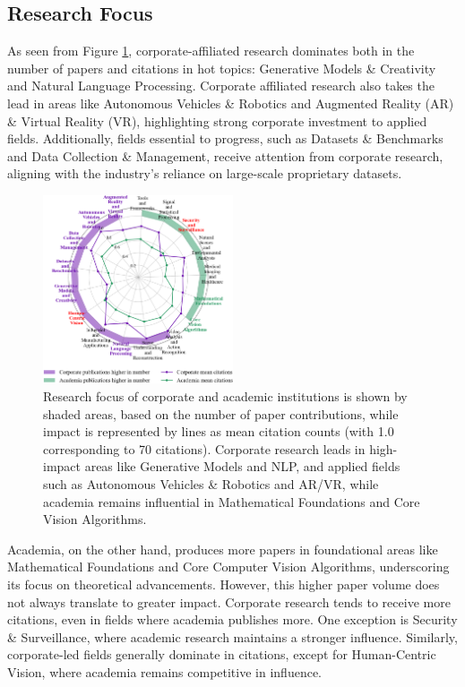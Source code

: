 \documentclass{article}
\begin{document}
\subsection{Research Focus}
\vspace{-7pt}
As seen from Figure \ref{fig:research_focus_radar}, corporate-affiliated research dominates both in the number of papers and citations in hot topics: Generative Models \& Creativity and Natural Language Processing. Corporate
affiliated research also takes the lead in areas like Autonomous Vehicles \& Robotics and Augmented Reality (AR) \& Virtual Reality (VR), highlighting strong corporate investment to applied fields. Additionally, fields essential to progress, such as Datasets \& Benchmarks and Data Collection \& Management, receive attention from corporate research, aligning with the industry's reliance on large-scale proprietary datasets.
\begin{figure}
\centering
\vspace{-10pt}
\includegraphics[width=0.5\textwidth]{report/images/citation_radar_plot.png}  
\caption{Research focus of corporate and academic institutions is shown by shaded areas, based on the number of paper contributions, while impact is represented by lines as mean citation counts (with 1.0 corresponding to 70 citations). Corporate research leads in high-impact areas like Generative Models and NLP, and applied fields such as Autonomous Vehicles \& Robotics and AR/VR, while academia remains influential in Mathematical Foundations and Core Vision Algorithms.}
\label{fig:research_focus_radar}

\end{figure}
Academia, on the other hand, produces more papers in foundational areas like Mathematical Foundations and Core Computer Vision Algorithms, underscoring its focus on theoretical advancements. However, this higher paper volume does not always translate to greater impact. Corporate research tends to receive more citations, even in fields where academia publishes more. One exception is Security \& Surveillance, where academic research maintains a stronger influence. Similarly, corporate-led fields generally dominate in citations, except for Human-Centric Vision, where academia remains competitive in influence. 
\end{document}
